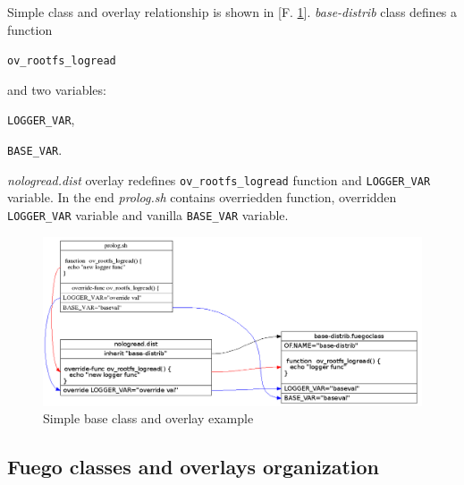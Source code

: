 Simple class and overlay relationship is shown in [F. \ref{fig:base_ov_example}].
\textit{base-distrib} class defines a function
\begin{description}
\item \texttt{ov\_rootfs\_logread}
\end{description}

and two variables:
\begin{description}
\item \texttt{LOGGER\_VAR},
\item \texttt{BASE\_VAR}.
\end{description}

\textit{nologread.dist} overlay redefines \texttt{ov\_rootfs\_logread} function and \texttt{LOGGER\_VAR} variable. In the end \textit{prolog.sh} contains overriedden function, overridden \texttt{LOGGER\_VAR} variable and vanilla \texttt{BASE\_VAR} variable.


\begin{figure}[H]
  \includegraphics*[width=16cm]{overlays_example.png}
  \caption{Simple base class and overlay example}
  \label{fig:base_ov_example}
\end{figure}


\subsection{Fuego classes and overlays organization}
\label{sec:fuego_class_ov}

